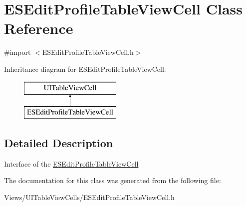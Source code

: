 \hypertarget{interface_e_s_edit_profile_table_view_cell}{}\section{E\+S\+Edit\+Profile\+Table\+View\+Cell Class Reference}
\label{interface_e_s_edit_profile_table_view_cell}


{\ttfamily \#import $<$E\+S\+Edit\+Profile\+Table\+View\+Cell.\+h$>$}

Inheritance diagram for E\+S\+Edit\+Profile\+Table\+View\+Cell\+:\begin{figure}[H]
\begin{center}
\leavevmode
\includegraphics[height=2.000000cm]{interface_e_s_edit_profile_table_view_cell}
\end{center}
\end{figure}


\subsection{Detailed Description}
Interface of the \hyperlink{interface_e_s_edit_profile_table_view_cell}{E\+S\+Edit\+Profile\+Table\+View\+Cell} 

The documentation for this class was generated from the following file\+:\begin{DoxyCompactItemize}
\item 
Views/\+U\+I\+Table\+View\+Cells/E\+S\+Edit\+Profile\+Table\+View\+Cell.\+h\end{DoxyCompactItemize}
